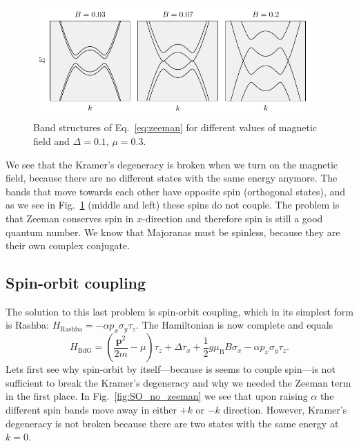 \begin{figure}
\begin{centering}
\includegraphics[width=0.95\textwidth]{chapter_introduction/figures/zeeman.pdf}
\par\end{centering}
\caption{Band structures of Eq.~\ref{eq:zeeman} for different values of magnetic field and $\Delta=0.1$, $\mu=0.3$.
\label{fig:zeeman}}
\end{figure}
We see that the Kramer's degeneracy is broken when we turn on the magnetic field, because there are no different states with the same energy anymore.
The bands that move towards each other have opposite spin (orthogonal states), and as we see in Fig.~\ref{fig:zeeman} (middle and left) these spins do not couple.
The problem is that Zeeman conserves spin in $x$-direction and therefore spin is still a good quantum number.
We know that Majoranas must be spinless, because they are their own complex conjugate.


\subsection{Spin-orbit coupling}

The solution to this last problem is spin-orbit coupling, which in its simplest form is Rashba: $H_{\textrm{Rashba}}=-\alpha p_{x}\sigma_{y}\tau_{z}$.
The Hamiltonian is now complete and equals
\begin{equation}
H_{\textrm{BdG}}=\left(\frac{\bm{p}^{2}}{2m}-\mu\right)\tau_{z}+\Delta\tau_{x}+\frac{1}{2}g\mu_{\textrm{B}}B\sigma_{x}-\alpha p_{x}\sigma_{y}\tau_{z}.\label{eq:rashba}
\end{equation}
Lets first see why spin-orbit by itself---because is seems to couple spin---is not sufficient to break the Kramer's degeneracy and why we needed the Zeeman term in the first place.
In Fig.~\ref{fig:SO_no_zeeman} we see that upon raising $\alpha$ the different spin bands move away in either $+k$ or $-k$ direction.
However, Kramer's degeneracy is not broken because there are two states with the same energy at $k=0$.

